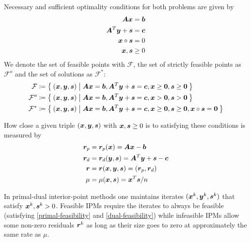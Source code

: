 Necessary and sufficient optimality conditions for both problems are given by
\begin{subequations} \label{optimality-conditions}
  \begin{align}
    \bm{A} \bm{x} &= \bm{b} \label{primal-feasibility} \\
    \bm{A}^T \bm{y} + \bm{s} &= \bm{c} \label{dual-feasibility} \\
    \bm{x} \circ \bm{s} &= 0 \label{complementarity} \\
    \bm{x}, \bm{s} &\geq 0 \label{nonnegativity}
  \end{align}
\end{subequations}
We denote the set of feasible points with \(\mathcal{F}\), the set of strictly feasible points as \(\mathcal{F}^o\) and the set of solutions as \(\mathcal{F}^*\):
\begin{align}
  \mathcal{F} &\coloneqq \Set{ (\bm{x}, \bm{y}, \bm{s}) | \bm{A}\bm{x} = \bm{b}, \bm{A}^T \bm{y} + \bm{s} = \bm{c}, \bm{x} \geq \bm{0}, \bm{s} \geq \bm{0}} \\
  \mathcal{F}^o &\coloneqq \Set{ (\bm{x}, \bm{y}, \bm{s}) | \bm{A}\bm{x} = \bm{b}, \bm{A}^T \bm{y} + \bm{s} = \bm{c}, \bm{x} > \bm{0}, \bm{s} > \bm{0}} \\
  \mathcal{F}^* &\coloneqq \Set{ (\bm{x}, \bm{y}, \bm{s}) | \bm{A}\bm{x} = \bm{b}, \bm{A}^T \bm{y} + \bm{s} = \bm{c}, \bm{x} \geq \bm{0}, \bm{s} \geq \bm{0}, \bm{x} \circ \bm{s} = \bm{0}}
\end{align}

How close a given triple \((\bm{x}, \bm{y}, \bm{s})\) with \(\bm{x}, \bm{s} \geq 0\) is to satisfying these conditions is measured by
\begin{subequations}
  \begin{align}
    \bm{r}_p &= \bm{r}_p(\bm{x}) = \bm{A}\bm{x} - \bm{b} \\
    \bm{r}_d &= \bm{r}_d(\bm{y}, \bm{s}) = \bm{A}^T \bm{y} + \bm{s} - \bm{c} \\
    \bm{r}   &= \bm{r}(\bm{x}, \bm{y}, \bm{s}) = (\bm{r}_p, \bm{r}_d) \\
    \mu       &= \mu(\bm{x}, \bm{s}) = \bm{x}^T \bm{s} / n
  \end{align}
\end{subequations}

In primal-dual interior-point methods one maintains iterates \((\bm{x}^k, \bm{y}^k, \bm{s}^k)\) that satisfy \(\bm{x}^k, \bm{s}^k > 0\).
Feasible IPMs require the iterates to always be feasible (satisfying \cref{primal-feasibility} and \cref{dual-feasibility}) while infeasible IPMs allow some non-zero residuals \(\bm{r}^k\) as long as their size goes to zero at approximately the same rate as \(\mu\).

